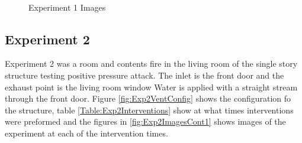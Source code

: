 \documentclass{article}
\begin{document}
\begin{figure}[H]
	\ContinuedFloat 
	\centering 
	 \ 
	 \ 
	 \ 
	\caption{Experiment 1 Images}
	\label{fig:Experiment1ImagesCont} 
\end{figure}

\subsection{Experiment 2}
Experiment 2 was a room and contents fire in the living room of the single story structure testing positive pressure attack. The inlet is the front door and the exhaust point is the living room window Water is applied with a straight stream through the front door. Figure \ref{fig:Exp2VentConfig} shows the configuration fo the structure, table \ref{Table:Exp2Interventions} show at what times interventions were preformed and the figures in \ref{fig:Exp2ImagesCont1} shows images of the experiment at each of the intervention times.
\end{document}
